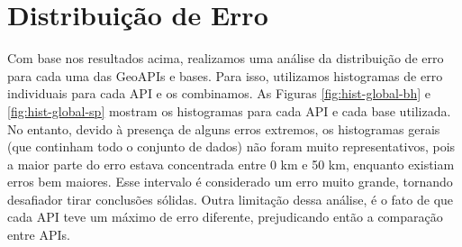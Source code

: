 \section{Distribuição de Erro}

Com base nos resultados acima, realizamos uma análise da distribuição de erro para cada uma das GeoAPIs e bases. Para isso, utilizamos histogramas de erro individuais para cada API e os combinamos. As Figuras \ref{fig:hist-global-bh} e \ref{fig:hist-global-sp} mostram os histogramas para cada API e cada base utilizada. No entanto, devido à presença de alguns erros extremos, os histogramas gerais (que continham todo o conjunto de dados) não foram muito representativos, pois a maior parte do erro estava concentrada entre 0 km e 50 km, enquanto existiam erros bem maiores. Esse intervalo é considerado um erro muito grande, tornando desafiador tirar conclusões sólidas. Outra limitação dessa análise, é o fato de que cada API teve um máximo de erro diferente, prejudicando então a comparação entre APIs.

